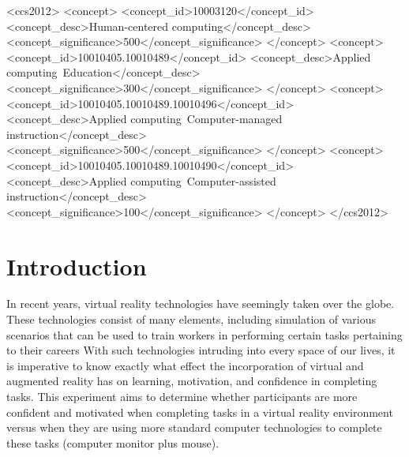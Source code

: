 \documentclass[manuscript,screen,review]{acmart}
\begin{document}
\begin{CCSXML}
<ccs2012>
   <concept>
       <concept_id>10003120</concept_id>
       <concept_desc>Human-centered computing</concept_desc>
       <concept_significance>500</concept_significance>
       </concept>
   <concept>
       <concept_id>10010405.10010489</concept_id>
       <concept_desc>Applied computing~Education</concept_desc>
       <concept_significance>300</concept_significance>
       </concept>
   <concept>
       <concept_id>10010405.10010489.10010496</concept_id>
       <concept_desc>Applied computing~Computer-managed instruction</concept_desc>
       <concept_significance>500</concept_significance>
       </concept>
   <concept>
       <concept_id>10010405.10010489.10010490</concept_id>
       <concept_desc>Applied computing~Computer-assisted instruction</concept_desc>
       <concept_significance>100</concept_significance>
       </concept>
 </ccs2012>
\end{CCSXML}




\maketitle

\section{Introduction}
In recent years, virtual reality technologies have seemingly taken over the globe. These technologies consist of many elements, including simulation of various scenarios that can be used to train workers in performing certain tasks pertaining to their careers \cite{zheng1998virtual} With such technologies intruding into every space of our lives, it is imperative to know exactly what effect the incorporation of virtual and augmented reality has on learning, motivation, and confidence in completing tasks. This experiment aims to determine whether participants are more confident and motivated when completing tasks in a virtual reality environment versus when they are using more standard computer technologies to complete these tasks (computer monitor plus mouse).
\end{document}
